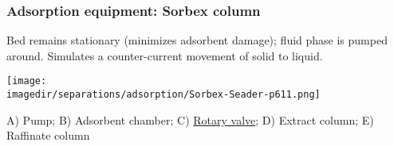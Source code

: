 \begin{frame}\frametitle{Adsorption equipment: Sorbex column}
	{\scriptsize Bed remains stationary (minimizes adsorbent damage); fluid phase is pumped around. Simulates a counter-current movement of solid to liquid.}
	\begin{center}
		\texttt{[image: \\imagedir/separations/adsorption/Sorbex-Seader-p611.png]}
	\end{center}
	\vspace{-12pt}

	{\tiny A) Pump; B) Adsorbent chamber; C) \href{http://www.uop.com/products/equipment/aromatics-separation/}{Rotary valve}; D) Extract column; E) Raffinate column}
	
	
	

	




\end{frame}

